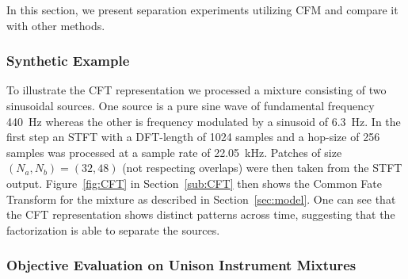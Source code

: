 In this section, we present separation experiments utilizing CFM and compare it with other methods.

\subsubsection{Synthetic Example}
\label{sub:Synthentic_Examples}

To illustrate the CFT representation we processed a mixture consisting of two sinusoidal sources. One source is a pure sine wave of fundamental frequency 440~Hz whereas the other is frequency modulated by a sinusoid of 6.3~Hz. In the first step an STFT with a DFT-length of 1024 samples and a hop-size of 256 samples was processed at a sample rate of 22.05~kHz. Patches of size $(N_a, N_b) = (32, 48)$ (not respecting overlaps) were then taken from the STFT output. Figure~\ref{fig:CFT} in Section~\ref{sub:CFT} then shows the Common Fate Transform for the mixture as described in Section~\ref{sec:model}. One can see that the CFT representation shows distinct patterns across time, suggesting that the factorization is able to separate the sources.


\subsubsection{Objective Evaluation on Unison Instrument Mixtures}

